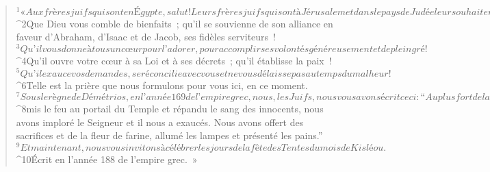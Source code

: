   
  
    
      
         
      \bchapter{}
      \begin{verse}
${}^{1}« Aux frères juifs qui sont en Égypte, salut ! Leurs frères juifs qui sont à Jérusalem et dans le pays de Judée leur souhaitent paix et prospérité. 
${}^{2}Que Dieu vous comble de bienfaits ; qu’il se souvienne de son alliance en faveur d’Abraham, d’Isaac et de Jacob, ses fidèles serviteurs ! 
${}^{3}Qu’il vous donne à tous un cœur pour l’adorer, pour accomplir ses volontés généreusement et de plein gré ! 
${}^{4}Qu’il ouvre votre cœur à sa Loi et à ses décrets ; qu’il établisse la paix ! 
${}^{5}Qu’il exauce vos demandes, se réconcilie avec vous et ne vous délaisse pas au temps du malheur ! 
${}^{6}Telle est la prière que nous formulons pour vous ici, en ce moment. 
${}^{7}Sous le règne de Démétrios, en l’année 169 de l’empire grec, nous, les Juifs, nous vous avons écrit ceci : “Au plus fort de la détresse qui s’est abattue sur nous durant ces années-là, alors que Jason et ses compagnons avaient trahi la Terre sainte et le royaume, 
${}^{8}mis le feu au portail du Temple et répandu le sang des innocents, nous avons imploré le Seigneur et il nous a exaucés. Nous avons offert des sacrifices et de la fleur de farine, allumé les lampes et présenté les pains.” 
${}^{9}Et maintenant, nous vous invitons à célébrer les jours de la fête des Tentes du mois de Kisléou. 
${}^{10}Écrit en l’année 188 de l’empire grec. »
      

\end{verse}

